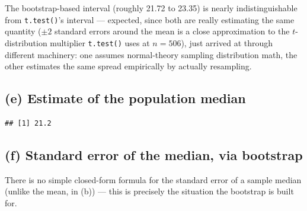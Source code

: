 \documentclass[
  11pt,
]{article}
\newenvironment{Shaded}{\begin{snugshade}}{\end{snugshade}}
\newcommand{\AttributeTok}[1]{\textcolor[rgb]{0.13,0.29,0.53}{#1}}
\newcommand{\ControlFlowTok}[1]{\textcolor[rgb]{0.13,0.29,0.53}{\textbf{#1}}}
\newcommand{\DecValTok}[1]{\textcolor[rgb]{0.00,0.00,0.81}{#1}}
\newcommand{\FunctionTok}[1]{\textcolor[rgb]{0.13,0.29,0.53}{\textbf{#1}}}
\newcommand{\NormalTok}[1]{#1}
\newcommand{\OtherTok}[1]{\textcolor[rgb]{0.56,0.35,0.01}{#1}}
\newcommand{\SpecialCharTok}[1]{\textcolor[rgb]{0.81,0.36,0.00}{\textbf{#1}}}
\begin{document}
The bootstrap-based interval (roughly 21.72 to 23.35) is nearly
indistinguishable from \texttt{t.test()}'s interval --- expected, since
both are really estimating the same quantity (\(\pm 2\) standard errors
around the mean is a close approximation to the \(t\)-distribution
multiplier \texttt{t.test()} uses at \(n=506\)), just arrived at through
different machinery: one assumes normal-theory sampling distribution
math, the other estimates the same spread empirically by actually
resampling.

\subsection{(e) Estimate of the population
median}\label{e-estimate-of-the-population-median}

\begin{Shaded}
\end{Shaded}

\begin{verbatim}
## [1] 21.2
\end{verbatim}

\subsection{(f) Standard error of the median, via
bootstrap}\label{f-standard-error-of-the-median-via-bootstrap}

There is no simple closed-form formula for the standard error of a
sample median (unlike the mean, in (b)) --- this is precisely the
situation the bootstrap is built for.

\begin{Shaded}
\end{Shaded}
\end{document}
